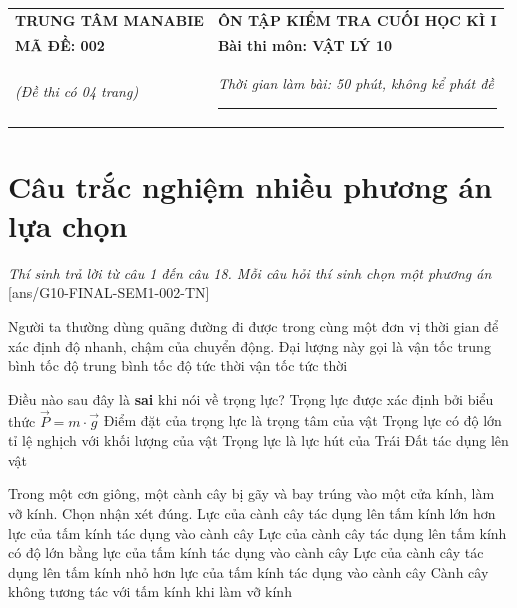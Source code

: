 \begin{center}
	\begin{tabular}{M{9.25cm}M{8.75cm}}
		\textbf{TRUNG TÂM MANABIE}& \textbf{ÔN TẬP KIỂM TRA CUỐI HỌC KÌ I}\\
		\textbf{MÃ ĐỀ: 002}& \textbf{Bài thi môn: VẬT LÝ 10}\\
		\textit{(Đề thi có 04 trang)}& \textit{Thời gian làm bài: 50 phút, không kể phát đề}
		\noindent\rule{4cm}{0.8pt} \\
	\end{tabular}
\end{center}
\setcounter{section}{0}
\vspace{-1cm}
\section{Câu trắc nghiệm nhiều phương án lựa chọn}
\textit{Thí sinh trả lời từ câu 1 đến câu 18. Mỗi câu hỏi thí sinh chọn một phương án}
\setcounter{ex}{0}
[ans/G10-FINAL-SEM1-002-TN]
\begin{ex}
	Người ta thường dùng quãng đường đi được trong cùng một đơn vị thời gian để xác định độ nhanh, chậm của chuyển động. Đại lượng này gọi là
	\choice
	{vận tốc trung bình}
	{\True tốc độ trung bình}
	{tốc độ tức thời}
	{vận tốc tức thời}
	\loigiai{}
\end{ex}
\begin{ex}
	Điều nào sau đây là \textbf{sai} khi nói về trọng lực?
	\choice
	{Trọng lực được xác định bởi biểu thức $\vec{P}=m\cdot\vec{g}$}
	{Điểm đặt của trọng lực là trọng tâm của vật}
	{\True Trọng lực có độ lớn tỉ lệ nghịch với khối lượng của vật}
	{Trọng lực là lực hút của Trái Đất tác dụng lên vật}
	\loigiai{}
\end{ex}
\begin{ex}
	Trong một cơn giông, một cành cây bị gãy và bay trúng vào một cửa kính, làm vỡ kính. Chọn nhận xét đúng.	
	\choice
	{Lực của cành cây tác dụng lên tấm kính lớn hơn lực của tấm kính tác dụng vào cành cây}
	{\True Lực của cành cây tác dụng lên tấm kính có độ lớn bằng lực của tấm kính tác dụng vào cành cây}
	{Lực của cành cây tác dụng lên tấm kính nhỏ hơn lực của tấm kính tác dụng vào cành cây}
	{Cành cây không tương tác với tấm kính khi làm vỡ kính}
	\loigiai{}
\end{ex}
